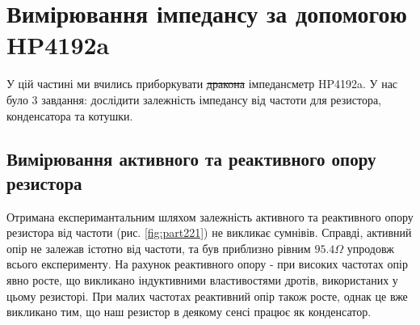 \chapter{Вимірювання імпедансу за допомогою HP4192a} 
\label{chap:first}

У цій частині ми вчились приборкувати \sout{дракона} імпедансметр HP4192a. У нас було 3 завдання: дослідити залежність імпедансу від частоти для резистора, конденсатора та котушки.

\section{Вимірювання активного та реактивного опору резистора}

Отримана експеримантальним шляхом залежність активного та реактивного опору резистора від частоти (рис. \ref{fig:part221}) не викликає сумнівів. Справді, активний опір не залежав істотно від частоти, та був приблизно рівним $95.4 \Omega$ упродовж всього експерименту. На рахунок реактивного опору - при високих частотах опір явно росте, що викликано індуктивними властивостями дротів, використаних у цьому резисторі. При малих частотах реактивний опір також росте, однак це вже викликано тим, що наш резистор в деякому сенсі працює як конденсатор.

